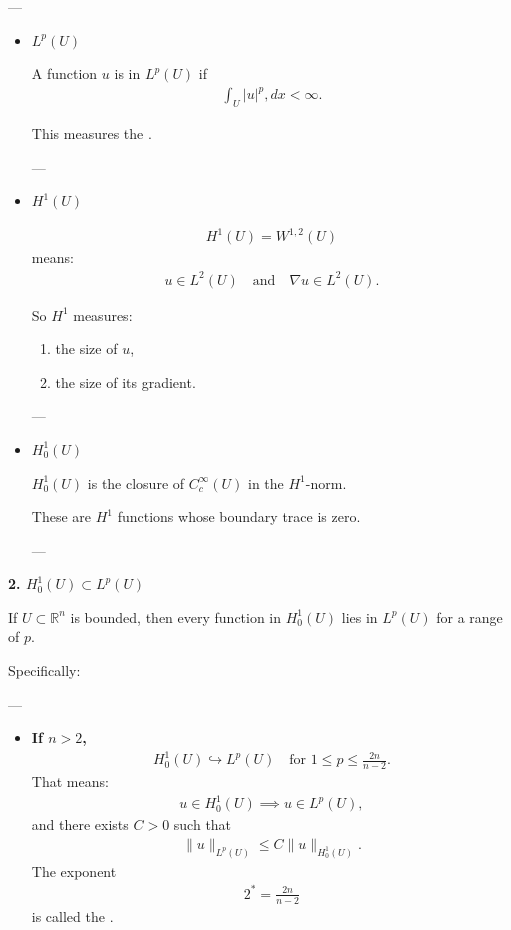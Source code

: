 \documentclass[12pt,a4paper]{report}
\begin{document}
\begin{description}
\begin{description}
---

\begin{itemize}
\item \textbf{$L^p(U)$}

A function $u$ is in $L^p(U)$ if
\begin{align*}
\int_U |u|^p,dx<\infty.
\end{align*}

This measures the .

---

\item \textbf{$H^1(U)$}

\begin{align*}
H^1(U)=W^{1,2}(U)
\end{align*}
means:
\begin{align*}
u\in L^2(U)
\quad\text{and}\quad
\nabla u\in L^2(U).
\end{align*}

So $H^1$ measures:

\begin{enumerate}
\item the size of $u$,
\item the size of its gradient.
\end{enumerate}

---

\item \textbf{$H_0^1(U)$}

$H_0^1(U)$ is the closure of $C_c^\infty(U)$ in the $H^1$-norm.

These are $H^1$ functions whose boundary trace is zero.

---
\end{itemize}

\item \textbf{2. $H_0^1(U)\subset L^p(U)$}

If $U\subset \mathbb R^n$ is bounded, then every function in $H_0^1(U)$ lies in $L^p(U)$ for a range of $p$.

Specifically:

---
\begin{itemize}

\item \textbf{If $n>2$,}
\begin{align*}
H_0^1(U)\hookrightarrow L^p(U)
\quad\text{for }1\le p\le \frac{2n}{n-2}.
\end{align*}
That means:
\begin{align*}
u\in H_0^1(U)\implies u\in L^p(U),
\end{align*}
and there exists $C>0$ such that
\begin{align*}
\|u\|_{L^p(U)} \le C\|u\|_{H_0^1(U)}.
\end{align*}
The exponent
\begin{align*}
2^*=\frac{2n}{n-2}
\end{align*}
is called the .


\end{itemize}
\end{description}
\end{description}
\end{document}
